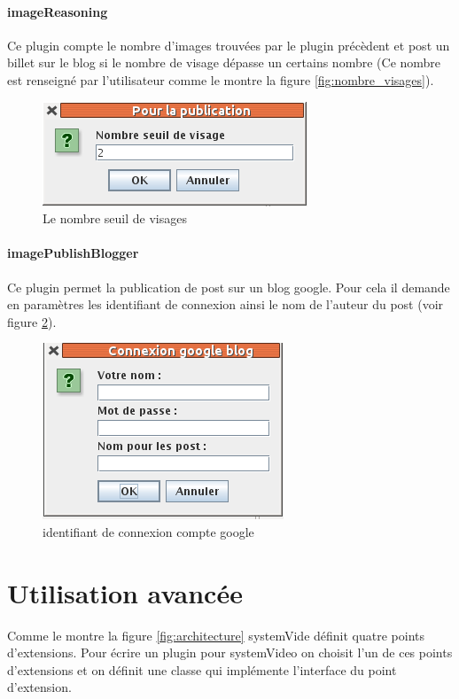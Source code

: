 \documentclass[a4paper , 12pt]{article}
\begin{document}
\subsection{imageReasoning}
Ce plugin compte le nombre d'images trouvées par le plugin précèdent et post un billet sur le blog si le nombre de visage dépasse un certains nombre (Ce nombre est renseigné par l'utilisateur comme le montre la figure \ref{fig:nombre_visages}).

\begin{figure}
  \includegraphics[scale=0.5]{images/nombre_visages.png}
  \caption{Le nombre seuil de visages}
  \label{fig:haar}
\end{figure}

\subsection{imagePublishBlogger}
Ce plugin permet la publication de post sur un blog google. Pour cela il demande en paramètres les identifiant de connexion ainsi le nom de l'auteur du post (voir figure \ref{fig:google}).

\begin{figure}
  \includegraphics[scale=0.45]{images/google.png}
  \caption{identifiant de connexion compte google}
  \label{fig:google}
\end{figure}

\part*{Utilisation avancée}
Comme le montre la figure \ref{fig:architecture} systemVide définit quatre points d'extensions. Pour écrire un plugin pour systemVideo on choisit l'un de ces points d'extensions et on définit une classe qui implémente l'interface du point d'extension.
\end{document}
